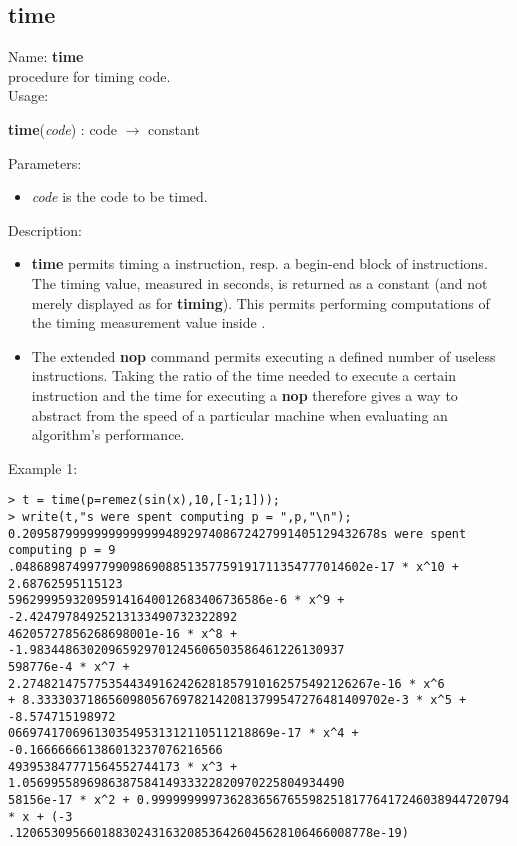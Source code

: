 \subsection{time}
\label{labtime}
\noindent Name: \textbf{time}\\
\phantom{aaa}procedure for timing \sollya code.\\[0.2cm]
\noindent Usage: 
\begin{center}
\textbf{time}(\emph{code}) : \textsf{code} $\rightarrow$ \textsf{constant}\\
\end{center}
Parameters: 
\begin{itemize}
\item \emph{code} is the code to be timed.
\end{itemize}
\noindent Description: \begin{itemize}

\item \textbf{time} permits timing a \sollya instruction, resp. a begin-end block
   of \sollya instructions. The timing value, measured in seconds, is returned
   as a \sollya constant (and not merely displayed as for \textbf{timing}). This 
   permits performing computations of the timing measurement value inside \sollya.

\item The extended \textbf{nop} command permits executing a defined number of
   useless instructions. Taking the ratio of the time needed to execute a
   certain \sollya instruction and the time for executing a \textbf{nop}
   therefore gives a way to abstract from the speed of a particular 
   machine when evaluating an algorithm's performance.
\end{itemize}
\noindent Example 1: 
\begin{center}\begin{minipage}{15cm}\begin{Verbatim}[frame=single]
> t = time(p=remez(sin(x),10,[-1;1]));
> write(t,"s were spent computing p = ",p,"\n");
0.20958799999999999999489297408672427991405129432678s were spent computing p = 9
.0486898749977990986908851357759191711354777014602e-17 * x^10 + 2.68762595115123
596299959320959141640012683406736586e-6 * x^9 + -2.42479784925213133490732322892
46205727856268698001e-16 * x^8 + -1.98344863020965929701245606503586461226130937
598776e-4 * x^7 + 2.2748214757753544349162426281857910162575492126267e-16 * x^6 
+ 8.3333037186560980567697821420813799547276481409702e-3 * x^5 + -8.574715198972
0669741706961303549531312110511218869e-17 * x^4 + -0.166666661386013237076216566
493953847771564552744173 * x^3 + 1.056995589698638758414933322820970225804934490
58156e-17 * x^2 + 0.99999999973628365676559825181776417246038944720794 * x + (-3
.12065309566018830243163208536426045628106466008778e-19)
\end{Verbatim}
\end{minipage}\end{center}
